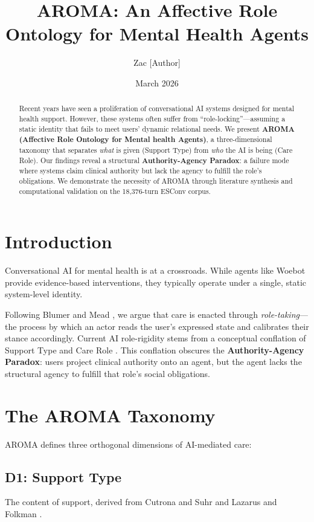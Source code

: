 \documentclass[11pt,a4paper]{article}
\title{\textbf{AROMA: An Affective Role Ontology for Mental Health Agents}}
\author[1]{Zac [Author]}
\affil[1]{University [Affiliation]}
\date{March 2026}
\begin{document}
\maketitle

\begin{abstract}
Recent years have seen a proliferation of conversational AI systems designed for mental health support. However, these systems often suffer from ``role-locking''---assuming a static identity that fails to meet users' dynamic relational needs. We present \textbf{AROMA (Affective Role Ontology for Mental health Agents)}, a three-dimensional taxonomy that separates \textit{what} is given (Support Type) from \textit{who} the AI is being (Care Role). Our findings reveal a structural \textbf{Authority-Agency Paradox}: a failure mode where systems claim clinical authority but lack the agency to fulfill the role’s obligations. We demonstrate the necessity of AROMA through literature synthesis and computational validation on the 18,376-turn ESConv corpus.
\end{abstract}

\section{Introduction}
Conversational AI for mental health is at a crossroads. While agents like Woebot provide evidence-based interventions, they typically operate under a single, static system-level identity. 

Following Blumer \cite{blumer1969symbolic} and Mead \cite{mead1934mind}, we argue that care is enacted through \textit{role-taking}---the process by which an actor reads the user's expressed state and calibrates their stance accordingly. Current AI role-rigidity stems from a conceptual conflation of Support Type \cite{cutrona1992social} and Care Role \cite{biddle1986recent}. This conflation obscures the \textbf{Authority-Agency Paradox}: users project clinical authority onto an agent, but the agent lacks the structural agency \cite{parsons1951social} to fulfill that role's social obligations.

\section{The AROMA Taxonomy}
AROMA defines three orthogonal dimensions of AI-mediated care:

\subsection{D1: Support Type}
The content of support, derived from Cutrona and Suhr \cite{cutrona1992social} and Lazarus and Folkman \cite{lazarus1984stress}.
\end{document}
